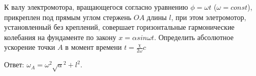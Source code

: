К валу электромотора, вращающегося согласно уравнению $\phi= \omega t$ ($ \omega= const $), прикреплен под прямым углом 
стержень $OA$ длины $l$, при этом элетромотор, установленный без креплений, совершает горизонтальные гармонические колебания на 
фундаменте по закону $x= \alpha sin \omega t$. Определить абсолютное ускорение точки $A$ в момент времени $t=\frac{\chi}{2\omega}c$

Ответ: $\omega_{A}=\omega^2 \sqrt a^2+l^2$.
